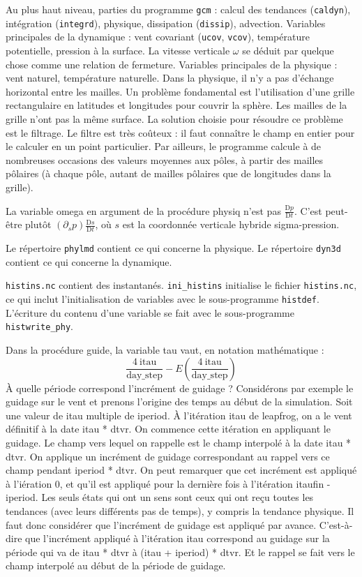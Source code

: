\documentclass[a4paper,english,french]{article}
\newcommand{\uD}{\mathrm{D}}
\begin{document}
Au plus haut niveau, parties du programme \verb+gcm+ : calcul des
tendances (\verb+caldyn+), intégration (\verb+integrd+), physique,
dissipation (\verb+dissip+), advection. Variables principales de la
dynamique : vent covariant (\verb+ucov+, \verb+vcov+), température
potentielle, pression à la surface. La vitesse verticale $\omega$ se
déduit par quelque chose comme une relation de fermeture. Variables
principales de la physique : vent naturel, température naturelle. Dans
la physique, il n'y a pas d'échange horizontal entre les mailles. Un
problème fondamental est l'utilisation d'une grille rectangulaire en
latitudes et longitudes pour couvrir la sphère. Les mailles de la
grille n'ont pas la même surface.  La solution choisie pour résoudre
ce problème est le filtrage. Le filtre est très coûteux : il faut
connaître le champ en entier pour le calculer en un point
particulier. Par ailleurs, le programme calcule à de nombreuses
occasions des valeurs moyennes aux pôles, à partir des mailles
pôlaires (à chaque pôle, autant de mailles pôlaires que de longitudes
dans la grille).

La variable omega en argument de la procédure physiq n'est pas
$\frac{\uD p}{\uD t}$. C'est peut-être plutôt
$(\partial_s p) \frac{\uD s}{\uD t}$, où $s$ est la coordonnée verticale
hybride sigma-pression.

Le répertoire \verb+phylmd+ contient ce qui concerne la 
physique. Le répertoire \verb+dyn3d+ contient ce qui concerne 
la dynamique.

\verb+histins.nc+ contient des instantanés. \verb+ini_histins+
initialise le fichier \verb+histins.nc+, ce qui inclut
l'initialisation de variables avec le sous-programme \verb+histdef+.
L'écriture du contenu d'une variable se fait avec le sous-programme
\verb+histwrite_phy+.

Dans la procédure guide, la variable tau vaut, en notation
mathématique :
\begin{equation*}
  \frac{4\ \mathrm{itau}}{\mathrm{day\_step}}
  - E\left(\frac{4\ \mathrm{itau}}{\mathrm{day\_step}} \right)
\end{equation*}
\`A quelle période correspond l'incrément de guidage ? Considérons par
exemple le guidage sur le vent et prenons l'origine des temps au début
de la simulation. Soit une valeur de itau multiple de iperiod. \`A
l'itération itau de leapfrog, on a le vent définitif à la date itau *
dtvr. On commence cette itération en appliquant le guidage. Le champ
vers lequel on rappelle est le champ interpolé à la date itau *
dtvr. On applique un incrément de guidage correspondant au rappel vers
ce champ pendant iperiod * dtvr. On peut remarquer que cet incrément
est appliqué à l'iération 0, et qu'il est appliqué pour la dernière
fois à l'itération itaufin - iperiod. Les seuls états qui ont un sens
sont ceux qui ont reçu toutes les tendances (avec leurs différents pas
de temps), y compris la tendance physique. Il faut donc considérer que
l'incrément de guidage est appliqué par avance. C'est-à-dire que
l'incrément appliqué à l'itération itau correspond au guidage sur la
période qui va de itau * dtvr à (itau + iperiod) * dtvr. Et le rappel
se fait vers le champ interpolé au début de la période de guidage.
\end{document}
